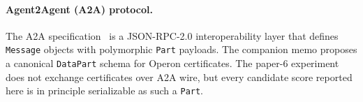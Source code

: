 \paragraph{Agent2Agent (A2A) protocol.}  The A2A
specification~\cite{a2a2025} is a JSON-RPC-2.0 interoperability
layer that defines \texttt{Message} objects with polymorphic
\texttt{Part} payloads.  The companion memo proposes a canonical
\texttt{DataPart} schema for Operon certificates.  The paper-6
experiment does not exchange certificates over A2A wire, but every
candidate score reported here is in principle serializable as such a
\texttt{Part}.
